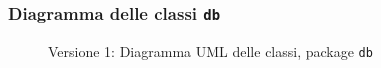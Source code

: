 \subsubsection{Diagramma delle classi \texttt{db}}
\vspace{0.5cm}
\begin{figure}[H]
    \centering
    \caption{Versione 1: Diagramma UML delle classi, package \texttt{db}}
    \label{fig:class_db_v_1}
\end{figure}